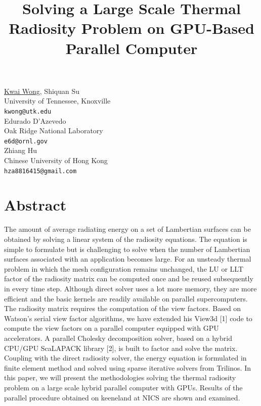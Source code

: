 \documentclass[article, A4, 11pt]{llncs}%
\begin{document}
\title{Solving a Large Scale Thermal Radiosity Problem on GPU-Based Parallel Computer}
 \author{} \institute{}
\maketitle
\begin{center}
{\large \underline{Kwai Wong}, Shiquan  Su}\\
University of Tennessee, Knoxville\\
{\tt kwong@utk.edu}
\\ \vspace{4mm}
{\large Edurado  D'Azevedo}\\
Oak Ridge National Laboratory\\
{\tt e6d@ornl.gov}
\\ \vspace{4mm}
{\large Zhiang Hu}\\
Chinese University of Hong Kong\\
{\tt hza8816415@gmail.com}
\end{center}

\section*{Abstract}
The amount of average radiating energy on a set of Lambertian surfaces can be obtained by solving a linear system of the radiosity equations. The equation is simple to formulate but is challenging to solve when the number of Lambertian surfaces associated with an application becomes large. For an unsteady thermal problem in which the mesh configuration remains unchanged, the LU or LLT factor of the radiosity matrix can be computed once and be reused subsequently in every time step. Although direct solver uses a lot more memory, they are more efficient and the basic kernels are readily available on parallel supercomputers. The radiosity matrix requires the computation of the view factors. Based on Watson’s serial view factor algorithms, we have extended his View3d [1] code to compute the view factors on a parallel computer equipped with GPU accelerators. A parallel Cholesky decomposition solver, based on a hybrid CPU/GPU ScaLAPACK library [2], is built to factor and solve the matrix. Coupling with the direct radiosity solver, the energy equation is formulated in finite element method and solved using sparse iterative solvers from Trilinos. In this paper, we will present the methodologies solving the thermal radiosity problem on a large scale hybrid parallel computer with GPUs. Results of the parallel procedure obtained on keeneland at NICS are shown and examined.
\end{document}
